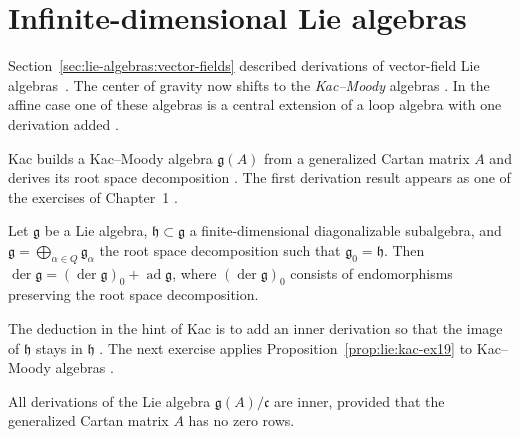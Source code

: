 \section{Infinite-dimensional Lie algebras}\label{sec:lie-algebras:infinite-dimensional}

Section~\ref{sec:lie-algebras:vector-fields} described derivations of
vector-field Lie algebras~\cite[pp.~74--75]{Kac1983}.  The center of gravity now shifts to the
\emph{Kac--Moody} algebras \cite[pp.~1--2]{Kac1983}.  In the affine
case one of these algebras is a central extension of a loop algebra
with one derivation added \cite[pp.~74--75]{Kac1983}.

Kac builds a Kac--Moody algebra $\mathfrak{g}(A)$ from a generalized
Cartan matrix $A$ and derives its root space decomposition
\cite[pp.~1--11]{Kac1983}.  The first derivation result appears as one
of the exercises of Chapter~1 \cite[Exercise~1.9, p.~11]{Kac1983}.

\begin{proposition}\label{prop:lie:kac-ex19}
Let $\mathfrak{g}$ be a Lie algebra, $\mathfrak{h}\subset\mathfrak{g}$ a
finite-dimensional diagonalizable subalgebra, and
$\mathfrak{g}=\bigoplus_{\alpha\in Q}\mathfrak{g}_{\alpha}$ the root space
decomposition such that $\mathfrak{g}_{0}=\mathfrak{h}$.  Then
$\operatorname{der}\mathfrak{g}=(\operatorname{der}\mathfrak{g})_{0}+\operatorname{ad}\mathfrak{g}$,
where $(\operatorname{der}\mathfrak{g})_{0}$ consists of endomorphisms
preserving the root space decomposition.
\end{proposition}

The deduction in the hint of Kac is to add an inner derivation so that the
image of $\mathfrak{h}$ stays in $\mathfrak{h}$ \cite[p.~11]{Kac1983}.
The next exercise applies Proposition~\ref{prop:lie:kac-ex19} to
Kac--Moody algebras \cite[Exercise~1.10, p.~11]{Kac1983}.

\begin{proposition}\label{prop:lie:kac-ex110}
All derivations of the Lie algebra $\mathfrak{g}(A)/\mathfrak{c}$ are
inner, provided that the generalized Cartan matrix $A$ has no zero rows.
\end{proposition}

